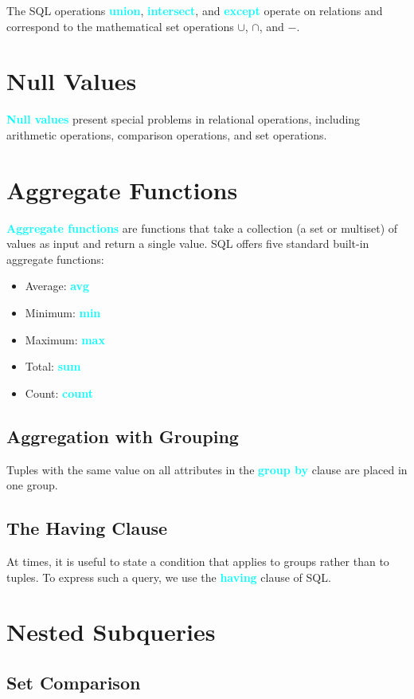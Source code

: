 \documentclass[a4paper,12pt,twoside,openany]{book}
\newcommand{\textcy}[1]{\textbf{\textcolor{cyan}{#1}}}
\begin{document}
The SQL operations \textcy{union}, \textcy{intersect}, and \textcy{except} operate on relations and correspond to the mathematical set operations $\cup$, $\cap$, and $-$.

\section{Null Values}

\textcy{Null values} present special problems in relational operations, including arithmetic operations, comparison operations, and set operations.

\section{Aggregate Functions}

\textcy{Aggregate functions} are functions that take a collection (a set or multiset) of values as input and return a single value. SQL offers five standard built-in aggregate functions:
\begin{itemize}
    \item Average: \textcy{avg}
    \item Minimum: \textcy{min}
    \item Maximum: \textcy{max}
    \item Total: \textcy{sum}
    \item Count: \textcy{count}
\end{itemize}

\subsection{Aggregation with Grouping}

Tuples with the same value on all attributes in the \textcy{group by} clause are placed in one group.

\subsection{The Having Clause}

At times, it is useful to state a condition that applies to groups rather than to tuples. To express such a query, we use the \textcy{having} clause of SQL.

\section{Nested Subqueries}
\subsection{Set Comparison}
\end{document}
